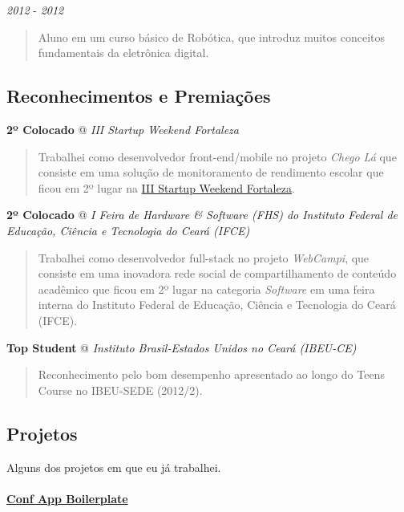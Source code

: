 \documentclass[]{article}
\let\oldparagraph\paragraph
\renewcommand{\paragraph}[1]{\oldparagraph{#1}\mbox{}}
\begin{document}
\emph{2012} - \emph{2012}

\begin{quote}
Aluno em um curso básico de Robótica, que introduz muitos conceitos
fundamentais da eletrônica digital.
\end{quote}

\subsection{Reconhecimentos e
Premiações}\label{reconhecimentos-e-premiauxe7uxf5es}

\textbf{2º Colocado} @ \emph{III Startup Weekend Fortaleza}

\begin{quote}
Trabalhei como desenvolvedor front-end/mobile no projeto \emph{Chego Lá}
que consiste em uma solução de monitoramento de rendimento escolar que
ficou em 2º lugar na
\href{http://www.up.co/communities/brazil/fortaleza/startup-weekend/4487}{III
Startup Weekend Fortaleza}.
\end{quote}

\textbf{2º Colocado} @ \emph{I Feira de Hardware \& Software (FHS) do
Instituto Federal de Educação, Ciência e Tecnologia do Ceará (IFCE)}

\begin{quote}
Trabalhei como desenvolvedor full-stack no projeto \emph{WebCampi}, que
consiste em uma inovadora rede social de compartilhamento de conteúdo
acadêmico que ficou em 2º lugar na categoria \emph{Software} em uma
feira interna do Instituto Federal de Educação, Ciência e Tecnologia do
Ceará (IFCE).
\end{quote}

\textbf{Top Student} @ \emph{Instituto Brasil-Estados Unidos no Ceará
(IBEU-CE)}

\begin{quote}
Reconhecimento pelo bom desempenho apresentado ao longo do Teens Course
no IBEU-SEDE (2012/2).
\end{quote}

\subsection{Projetos}\label{projetos}

Alguns dos projetos em que eu já trabalhei.

\paragraph{\texorpdfstring{\href{https://github.com/devevents/conf-app-boilerplate}{Conf
App Boilerplate}}{Conf App Boilerplate}}\label{conf-app-boilerplate}
\end{document}
